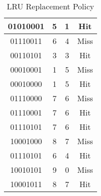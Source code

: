 \documentclass[12pt]{article}
\begin{document}
\begin{table}
\begin{tabular}{|c|c|c|c|}
\hline
01010001                                                                     & 5                  & 1                      & Hit                 \\ 
\hline
01110011                                                                     & 6                  & 4                      & Miss                \\ 
\hline
00110101                                                                     & 3                  & 3                      & Hit                 \\ 
\hline
00010001                                                                     & 1                  & 5                      & Miss                \\ 
\hline
00010000                                                                     & 1                  & 5                      & Hit                 \\ 
\hline
01110000                                                                     & 7                  & 6                      & Miss                \\ 
\hline
01110001                                                                     & 7                  & 6                      & Hit                 \\ 
\hline
01110101                                                                     & 7                  & 6                      & Hit                 \\ 
\hline
10001000                                                                     & 8                  & 7                      & Miss                \\ 
\hline
01110101                                                                     & 6                  & 4                      & Hit                 \\ 
\hline
10010101                                                                     & 9                  & 0                      & Miss                \\ 
\hline
10001011                                                                     & 8                  & 7                      & Hit                 \\
\hline
\end{tabular}
\caption{LRU Replacement Policy}
\end{table}
\end{document}

